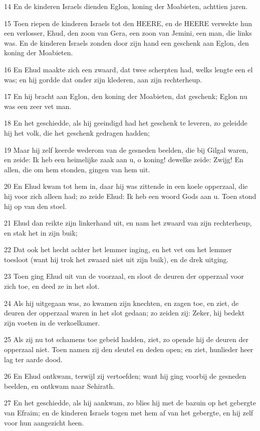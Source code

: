 \par 14 En de kinderen Israels dienden Eglon, koning der Moabieten, achttien jaren.
\par 15 Toen riepen de kinderen Israels tot den HEERE, en de HEERE verwekte hun een verlosser, Ehud, den zoon van Gera, een zoon van Jemini, een man, die links was. En de kinderen Israels zonden door zijn hand een geschenk aan Eglon, den koning der Moabieten.
\par 16 En Ehud maakte zich een zwaard, dat twee scherpten had, welks lengte een el was; en hij gordde dat onder zijn klederen, aan zijn rechterheup.
\par 17 En hij bracht aan Eglon, den koning der Moabieten, dat geschenk; Eglon nu was een zeer vet man.
\par 18 En het geschiedde, als hij geeindigd had het geschenk te leveren, zo geleidde hij het volk, die het geschenk gedragen hadden;
\par 19 Maar hij zelf keerde wederom van de gesneden beelden, die bij Gilgal waren, en zeide: Ik heb een heimelijke zaak aan u, o koning! dewelke zeide: Zwijg! En allen, die om hem stonden, gingen van hem uit.
\par 20 En Ehud kwam tot hem in, daar hij was zittende in een koele opperzaal, die hij voor zich alleen had; zo zeide Ehud: Ik heb een woord Gods aan u. Toen stond hij op van den stoel.
\par 21 Ehud dan reikte zijn linkerhand uit, en nam het zwaard van zijn rechterheup, en stak het in zijn buik;
\par 22 Dat ook het hecht achter het lemmer inging, en het vet om het lemmer toesloot (want hij trok het zwaard niet uit zijn buik), en de drek uitging.
\par 23 Toen ging Ehud uit van de voorzaal, en sloot de deuren der opperzaal voor zich toe, en deed ze in het slot.
\par 24 Als hij uitgegaan was, zo kwamen zijn knechten, en zagen toe, en ziet, de deuren der opperzaal waren in het slot gedaan; zo zeiden zij: Zeker, hij bedekt zijn voeten in de verkoelkamer.
\par 25 Als zij nu tot schamens toe gebeid hadden, ziet, zo opende hij de deuren der opperzaal niet. Toen namen zij den sleutel en deden open; en ziet, hunlieder heer lag ter aarde dood.
\par 26 En Ehud ontkwam, terwijl zij vertoefden; want hij ging voorbij de gesneden beelden, en ontkwam naar Sehirath.
\par 27 En het geschiedde, als hij aankwam, zo blies hij met de bazuin op het gebergte van Efraim; en de kinderen Israels togen met hem af van het gebergte, en hij zelf voor hun aangezicht heen.
